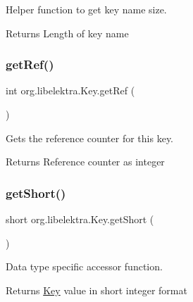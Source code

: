 Helper function to get key name size. 

\begin{DoxyReturn}{Returns}
Length of key name 
\end{DoxyReturn}
\mbox{\label{classorg_1_1libelektra_1_1Key_a3672b9c763ac97d78317b3d54a370107}} 
\subsubsection{\texorpdfstring{get\+Ref()}{getRef()}}
{\footnotesize\ttfamily int org.\+libelektra.\+Key.\+get\+Ref (\begin{DoxyParamCaption}{ }\end{DoxyParamCaption})\hspace{0.3cm}{\ttfamily [inline]}}



Gets the reference counter for this key. 

\begin{DoxyReturn}{Returns}
Reference counter as integer 
\end{DoxyReturn}
\mbox{\label{classorg_1_1libelektra_1_1Key_a51754727fad0f4f9a540226ec329c74b}} 
\subsubsection{\texorpdfstring{get\+Short()}{getShort()}}
{\footnotesize\ttfamily short org.\+libelektra.\+Key.\+get\+Short (\begin{DoxyParamCaption}{ }\end{DoxyParamCaption})\hspace{0.3cm}{\ttfamily [inline]}}



Data type specific accessor function. 

\begin{DoxyReturn}{Returns}
\hyperlink{classorg_1_1libelektra_1_1Key}{Key} value in short integer format 
\end{DoxyReturn}
\mbox{\label{classorg_1_1libelektra_1_1Key_a3464485c19d49b6763f6c831cf5ed06c}} 
